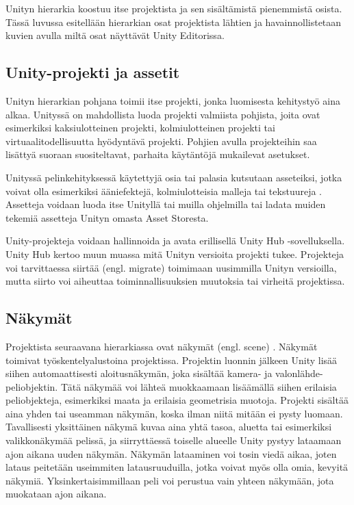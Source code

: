\documentclass[utf8]{gradu3}
\begin{document}
Unityn hierarkia koostuu itse projektista ja sen sisältämistä pienemmistä osista. Tässä luvussa esitellään hierarkian osat projektista lähtien ja havainnollistetaan kuvien avulla miltä osat näyttävät Unity Editorissa.

\subsection{Unity-projekti ja assetit}

Unityn hierarkian pohjana toimii itse projekti, jonka luomisesta kehitystyö aina alkaa. Unityssä on mahdollista luoda projekti valmiista pohjista, joita ovat esimerkiksi kaksiulotteinen projekti, kolmiulotteinen projekti tai virtuaalitodellisuutta hyödyntävä projekti. Pohjien avulla projekteihin saa lisättyä suoraan suositeltavat, parhaita käytäntöjä mukailevat asetukset.

Unityssä pelinkehityksessä käytettyjä osia tai palasia kutsutaan asseteiksi, jotka voivat olla esimerkiksi ääniefektejä, kolmiulotteisia malleja tai tekstuureja \parencite{unitydocasset}. Assetteja voidaan luoda itse Unityllä tai muilla ohjelmilla tai ladata muiden tekemiä assetteja Unityn omasta Asset Storesta.

Unity-projekteja voidaan hallinnoida ja avata erillisellä Unity Hub -sovelluksella. Unity Hub kertoo muun muassa mitä Unityn versioita projekti tukee. Projekteja voi tarvittaessa siirtää (engl. migrate) toimimaan uusimmilla Unityn versioilla, mutta siirto voi aiheuttaa toiminnallisuuksien muutoksia tai virheitä projektissa.

\subsection{Näkymät}

Projektista seuraavana hierarkiassa ovat näkymät (engl. scene) \parencite{unitydocscene}. Näkymät toimivat työskentelyalustoina projektissa. Projektin luonnin jälkeen Unity lisää siihen automaattisesti aloitusnäkymän, joka sisältää kamera- ja valonlähde-peliobjektin. Tätä näkymää voi lähteä muokkaamaan lisäämällä siihen erilaisia peliobjekteja, esimerkiksi maata ja erilaisia geometrisia muotoja. Projekti sisältää aina yhden tai useamman näkymän, koska ilman niitä mitään ei pysty luomaan. Tavallisesti yksittäinen näkymä kuvaa aina yhtä tasoa, aluetta tai esimerkiksi valikkonäkymää pelissä, ja siirryttäessä toiselle alueelle Unity pystyy lataamaan ajon aikana uuden näkymän. Näkymän lataaminen voi tosin viedä aikaa, joten lataus peitetään useimmiten latausruuduilla, jotka voivat myös olla omia, kevyitä näkymiä. Yksinkertaisimmillaan peli voi perustua vain yhteen näkymään, jota muokataan ajon aikana.
\end{document}
